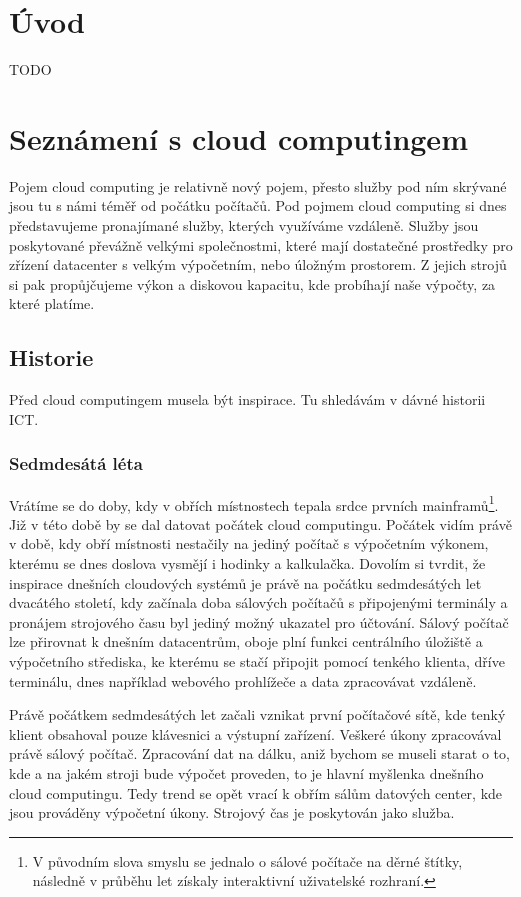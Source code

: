 \section{Úvod}
TODO

\section{Seznámení s cloud computingem}
Pojem cloud computing je relativně nový pojem, přesto služby pod ním skrývané jsou tu s námi téměř od počátku počítačů. Pod pojmem cloud computing si dnes představujeme pronajímané služby, kterých využíváme vzdáleně. Služby jsou poskytované převážně velkými společnostmi, které mají dostatečné prostředky pro zřízení datacenter s velkým výpočetním, nebo úložným prostorem. Z jejich strojů si pak propůjčujeme výkon a diskovou kapacitu, kde probíhají naše výpočty, za které platíme.

\subsection{Historie}
Před cloud computingem musela být inspirace. Tu shledávám v dávné historii ICT.

\subsubsection{Sedmdesátá léta}
Vrátíme se do doby, kdy v obřích místnostech tepala srdce prvních mainframů\footnote{V původním slova smyslu se jednalo o sálové počítače na děrné štítky, následně v průběhu let získaly interaktivní uživatelské rozhraní.}. Již v této době by se dal datovat počátek cloud computingu. Počátek vidím právě v době, kdy obří místnosti nestačily na jediný počítač s výpočetním výkonem, kterému se dnes doslova vysmějí i hodinky a kalkulačka. Dovolím si tvrdit, že inspirace dnešních cloudových systémů je právě na počátku sedmdesátých let dvacátého století, kdy začínala doba sálových počítačů s připojenými terminály a pronájem strojového času byl jediný možný ukazatel pro účtování. Sálový počítač lze přirovnat k dnešním datacentrům, oboje plní funkci centrálního úložiště a výpočetního střediska, ke kterému se stačí připojit pomocí tenkého klienta, dříve terminálu, dnes například webového prohlížeče a data zpracovávat vzdáleně.

Právě počátkem sedmdesátých let začali vznikat první počítačové sítě, kde tenký klient obsahoval pouze klávesnici a výstupní zařízení. Veškeré úkony zpracovával právě sálový počítač. Zpracování dat na dálku, aniž bychom se museli starat o to, kde a na jakém stroji bude výpočet proveden, to je hlavní myšlenka dnešního cloud computingu. Tedy trend se opět vrací k obřím sálům datových center, kde jsou prováděny výpočetní úkony. Strojový čas je poskytován jako služba.

